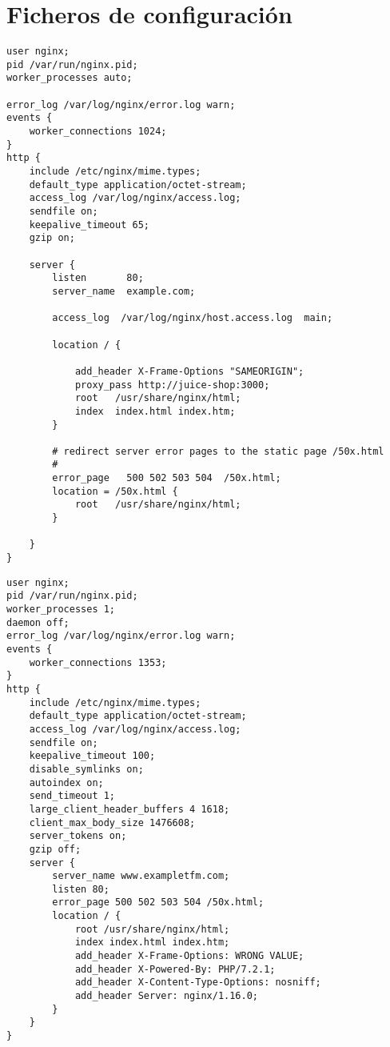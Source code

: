 \section{Ficheros de configuración}

\begin{lstlisting}[label={lst:nginx_config},caption={Ejemplo de fichero de configuración de NGINX}]
user nginx;
pid /var/run/nginx.pid;
worker_processes auto;

error_log /var/log/nginx/error.log warn;
events {
    worker_connections 1024;
}
http {
    include /etc/nginx/mime.types;
    default_type application/octet-stream;
    access_log /var/log/nginx/access.log;
    sendfile on;
    keepalive_timeout 65;
    gzip on;

    server {
        listen       80;
        server_name  example.com;

        access_log  /var/log/nginx/host.access.log  main;

        location / {

            add_header X-Frame-Options "SAMEORIGIN";
            proxy_pass http://juice-shop:3000;
            root   /usr/share/nginx/html;
            index  index.html index.htm;
        }

        # redirect server error pages to the static page /50x.html
        #
        error_page   500 502 503 504  /50x.html;
        location = /50x.html {
            root   /usr/share/nginx/html;
        }

    }
}
\end{lstlisting}

\begin{lstlisting}[label={lst:nginx_config_random},caption={Ejemplo de configuración aleatoria de NGINX}]
user nginx;
pid /var/run/nginx.pid;
worker_processes 1;
daemon off;
error_log /var/log/nginx/error.log warn;
events {
    worker_connections 1353;
}
http {
    include /etc/nginx/mime.types;
    default_type application/octet-stream;
    access_log /var/log/nginx/access.log;
    sendfile on;
    keepalive_timeout 100;
    disable_symlinks on;
    autoindex on;
    send_timeout 1;
    large_client_header_buffers 4 1618;
    client_max_body_size 1476608;
    server_tokens on;
    gzip off;
    server {
        server_name www.exampletfm.com;
        listen 80;
        error_page 500 502 503 504 /50x.html;
        location / {
            root /usr/share/nginx/html;
            index index.html index.htm;
            add_header X-Frame-Options: WRONG VALUE;
            add_header X-Powered-By: PHP/7.2.1;
            add_header X-Content-Type-Options: nosniff;
            add_header Server: nginx/1.16.0;
        }
    }
}
\end{lstlisting}

